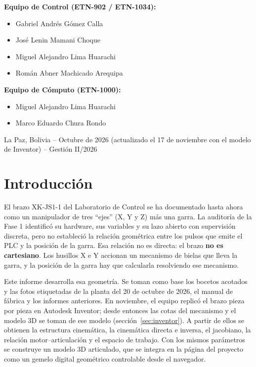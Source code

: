 \documentclass[a4paper,12pt]{article}
\begin{document}
\begin{titlepage}
\vspace{0.8cm}
\begin{minipage}[t]{0.55\textwidth}
\textbf{Equipo de Control (ETN-902 / ETN-1034):}
\begin{itemize}\setlength\itemsep{0pt}
\item Gabriel Andrés Gómez Calla
\item José Lenin Mamani Choque
\item Miguel Alejandro Lima Huarachi
\item Román Abner Machicado Arequipa
\end{itemize}
\end{minipage}\hfill
\begin{minipage}[t]{0.42\textwidth}
\textbf{Equipo de Cómputo (ETN-1000):}
\begin{itemize}\setlength\itemsep{0pt}
\item Miguel Alejandro Lima Huarachi
\item Marco Eduardo Chura Rondo
\end{itemize}
\end{minipage}

\vfill
\begin{center}
La Paz, Bolivia -- Octubre de 2026 (actualizado el 17 de noviembre con el modelo de Inventor) -- Gestión II/2026
\end{center}
\end{titlepage}
\normalcolor

\tableofcontents
\newpage

\section{Introducción}

El brazo XK-JS1-1 del Laboratorio de Control se ha documentado hasta ahora como un manipulador de tres
``ejes'' (X, Y y Z) más una garra. La auditoría de la Fase 1 identificó su hardware, sus variables y su
lazo abierto con supervisión discreta, pero no estableció la relación geométrica entre los pulsos que emite
el PLC y la posición de la garra. Esa relación no es directa: el brazo \textbf{no es cartesiano}. Los
husillos X e Y accionan un mecanismo de bielas que lleva la garra, y la posición de la garra hay que
calcularla resolviendo ese mecanismo.

Este informe desarrolla esa geometría. Se toman como base los bocetos acotados y las fotos etiquetadas de la
planta del 20 de octubre de 2026, el manual de fábrica y los informes anteriores. En noviembre, el equipo
replicó el brazo pieza por pieza en Autodesk Inventor; desde entonces las cotas del mecanismo y el modelo 3D
se toman de ese modelo (sección~\ref{sec:inventor}). A partir de ellos se
obtienen la estructura cinemática, la cinemática directa e inversa, el jacobiano, la relación
motor--articulación y el espacio de trabajo. Con los mismos parámetros se construye un modelo 3D articulado,
que se integra en la página del proyecto como un gemelo digital geométrico controlable desde el navegador.
\end{document}
